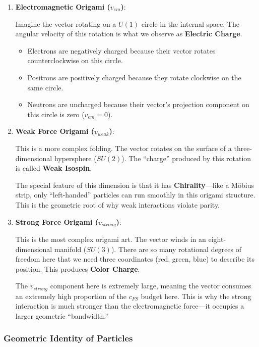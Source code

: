 \begin{enumerate}
\item \textbf{Electromagnetic Origami ($v_{em}$)}:

    Imagine the vector rotating on a $U(1)$ circle in the internal space. The angular velocity of this rotation is what we observe as \textbf{Electric Charge}.

    \begin{itemize}
    \item Electrons are negatively charged because their vector rotates counterclockwise on this circle.

    \item Positrons are positively charged because they rotate clockwise on the same circle.

    \item Neutrons are uncharged because their vector's projection component on this circle is zero ($v_{em} = 0$).
    \end{itemize}

\item \textbf{Weak Force Origami ($v_{weak}$)}:

    This is a more complex folding. The vector rotates on the surface of a three-dimensional hypersphere ($SU(2)$). The ``charge'' produced by this rotation is called \textbf{Weak Isospin}.

    The special feature of this dimension is that it has \textbf{Chirality}---like a Möbius strip, only ``left-handed'' particles can run smoothly in this origami structure. This is the geometric root of why weak interactions violate parity.

\item \textbf{Strong Force Origami ($v_{strong}$)}:

    This is the most complex origami art. The vector winds in an eight-dimensional manifold ($SU(3)$). There are so many rotational degrees of freedom here that we need three coordinates (red, green, blue) to describe its position. This produces \textbf{Color Charge}.

    The $v_{strong}$ component here is extremely large, meaning the vector consumes an extremely high proportion of the $c_{FS}$ budget here. This is why the strong interaction is much stronger than the electromagnetic force---it occupies a larger geometric ``bandwidth.''
\end{enumerate}

\subsubsection{Geometric Identity of Particles}

